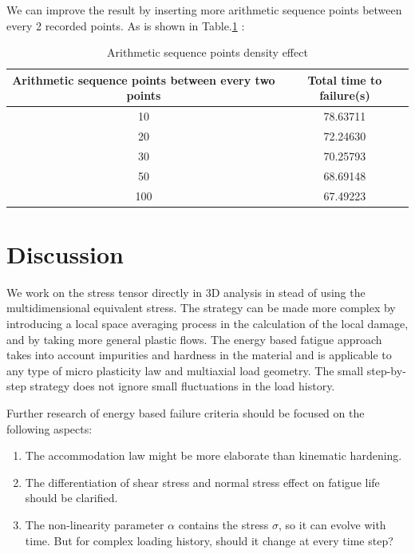 \documentclass[3p,times,number,review]{elsarticle}
\begin{document}
We can improve the result by inserting more arithmetic sequence points between every 2 recorded points. As is shown in Table.\ref{steppoints} :

\begin{table}[!h]
	\centering
	\caption{Arithmetic sequence points density effect}
	\label{steppoints}
\begin{tabular}{cc}
	\hline
	\textbf{Arithmetic sequence points between every two points} & \textbf{Total time to failure(s)} \\ \hline
	10                                                           & 78.63711                          \\ 
	20                                                           & 72.24630                          \\ 
	30                                                           & 70.25793                          \\ 
	50                                                           & 68.69148                          \\ 
	100                                                          & 67.49223                          \\ \hline
\end{tabular}
\end{table}

 
 
\clearpage
\section{Discussion}
We work on the stress tensor directly in 3D analysis in stead of using the multidimensional equivalent stress.
The strategy can be made more complex by introducing a local space averaging process in the calculation of the local damage, and by taking more general plastic flows. The energy based fatigue approach takes into account impurities and hardness in the material and is applicable to any type of micro plasticity law and multiaxial load geometry. The small step-by-step strategy does not ignore small fluctuations in the load history. 

Further research of energy based failure criteria should be focused on the following aspects:
\begin{enumerate}
\item The  accommodation law might be more elaborate than kinematic hardening.

\vspace{6pt}
\item The differentiation of shear stress and normal stress effect on fatigue life should be clarified.

\vspace{6pt}
\item The non-linearity parameter $\alpha$ contains the stress $\sigma$, so it can evolve with time. But for complex loading history, should it change at every time step?

\end{enumerate}
\end{document}
